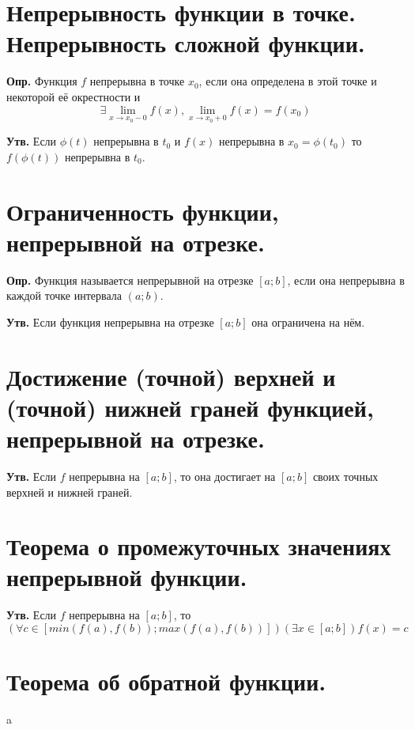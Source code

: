 \documentclass[a4paper,12pt]{article}
\begin{document}
\begin{flushleft}
\section{Непрерывность функции в точке. Непрерывность сложной функции.}

	\textbf{Опр.} Функция $f$ непрерывна в точке $x_0$, если она определена в этой точке и некоторой её окрестности и $$\exists \lim_{x \to x_0 - 0} f(x), \lim_{x \to x_0 + 0} f(x) = f(x_0)$$
	
    \textbf{Утв.} Если $\phi(t)$ непрерывна в $t_0$ и $f(x)$ непрерывна в $x_0 = \phi(t_0)$ то $f(\phi(t))$ непрерывна в $t_0$.
    
\section{Ограниченность функции, непрерывной на отрезке.}

	\textbf{Опр.} Функция называется непрерывной на отрезке $[a; b]$, если она непрерывна в каждой точке интервала $(a; b)$.
    
    \textbf{Утв.} Если функция непрерывна на отрезке $[a; b]$ она ограничена на нём.
	
\section{Достижение (точной) верхней и (точной) нижней граней функцией, непрерывной на отрезке.}

	\textbf{Утв.} Если $f$ непрерывна на $[a;b]$, то она достигает на $[a;b]$ своих точных верхней и нижней граней.
	
\section{Теорема о промежуточных значениях непрерывной функции.}

	\textbf{Утв.} Если $f$ непрерывна на $[a;b]$, то $(\forall c \in [min(f(a), f(b)); max(f(a), f(b))]) (\exists x \in [a; b]) f(x) = c$
	
	\section{Теорема об обратной функции.}

	a

\end{flushleft}
\end{document}
